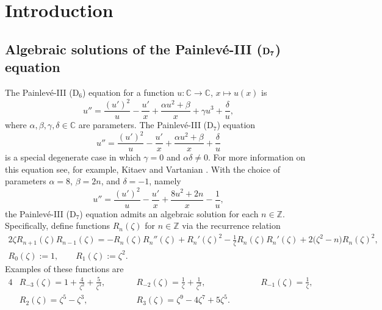 \section{Introduction}

\subsection[Algebraic solutions of the Painlev\'e-III (D\_7) equation]{Algebraic solutions of the Painlev\'e-III ($\boldsymbol{{\rm D}_7}$) equation}

The Painlev\'e-III (D$_6$) equation for a function
$u\colon\mathbb{C}\to\mathbb{C}$, $x\mapsto u(x)$ is
\begin{equation*}
u'' = \frac{(u')^2}{u}-\frac{u'}{x}+\frac{\alpha u^2+\beta}{x}+\gamma u^3+\frac{\delta}{u},
\end{equation*}
where $\alpha,\beta,\gamma,\delta\in\mathbb{C}$ are parameters.
The Painlev\'e-III (D$_7$) equation
\begin{equation*}
u'' = \frac{(u')^2}{u}-\frac{u'}{x}+\frac{\alpha u^2+\beta}{x}+\frac{\delta}{u}
\end{equation*}
is a special degenerate case in which $\gamma=0$ and $\alpha\delta\neq 0$.
For more information on this equation see, for example, Kitaev and Vartanian
\cite{KitaevV:2004}.
With the choice of parameters $\alpha=8$, $\beta=2n$, and $\delta=-1$, namely
\begin{equation}
\label{p3d7}
u'' = \frac{(u')^2}{u}-\frac{u'}{x}+\frac{8u^2+2n}{x}-\frac{1}{u},
\end{equation}
the Painlev\'e-III (D$_7$) equation admits an algebraic solution for each
$n\in\mathbb{Z}$.
Specifically, define functions $R_n(\zeta)$ for $n\in\mathbb{Z}$ via
the recurrence relation
\begin{gather*}
 2\zeta R_{n+1}(\zeta)R_{n-1}(\zeta) = -R_n(\zeta)R_n''(\zeta)+R_n'(\zeta)^2
-\frac{1}{\zeta}R_n(\zeta)R_n'(\zeta)+2\bigl(\zeta^2-n\bigr)R_n(\zeta)^2, \\
 R_0(\zeta):=1, \qquad R_1(\zeta):=\zeta^2.
\end{gather*}
Examples of these functions are
\begin{alignat*}{4}
& R_{-3}(\zeta) = 1 + \frac{4}{\zeta^2} + \frac{5}{\zeta^4}, \qquad &&
R_{-2}(\zeta) = \frac{1}{\zeta} + \frac{1}{\zeta^3}, \qquad &&
R_{-1}(\zeta) = \frac{1}{\zeta},& \\
& R_2(\zeta) = \zeta^5-\zeta^3, \qquad &&
R_3(\zeta) = \zeta^9 - 4\zeta^7 + 5\zeta^5. \qquad &
\end{alignat*}
